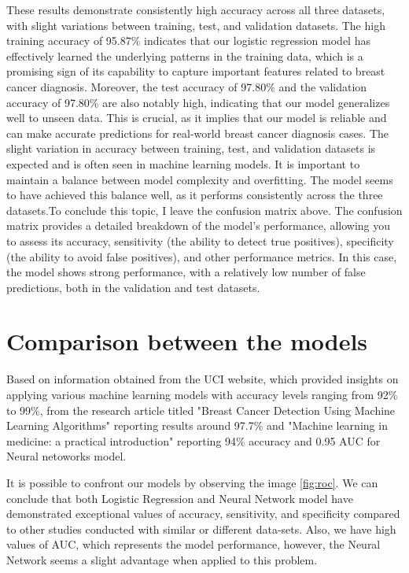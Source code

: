 \documentclass[12pt,a4paper,twocolumn]{article}
\begin{document}
These results demonstrate consistently high accuracy across all three datasets, with slight variations between training, test, and validation datasets. The high training accuracy of 95.87\% indicates that our logistic regression model has effectively learned the underlying patterns in the training data, which is a promising sign of its capability to capture important features related to breast cancer diagnosis. Moreover, the test accuracy of 97.80\% and the validation accuracy of 97.80\% are also notably high, indicating that our model generalizes well to unseen data. This is crucial, as it implies that our model is reliable and can make accurate predictions for real-world breast cancer diagnosis cases. The slight variation in accuracy between training, test, and validation datasets is expected and is often seen in machine learning models. It is important to maintain a balance between model complexity and overfitting. The model seems to have achieved this balance well, as it performs consistently across the three datasets.To conclude this topic, I leave the confusion matrix above. The confusion matrix provides a detailed breakdown of the model's performance, allowing you to assess its accuracy, sensitivity (the ability to detect true positives), specificity (the ability to avoid false positives), and other performance metrics. In this case, the model shows strong performance, with a relatively low number of false predictions, both in the validation and test datasets.



\section{Comparison between the models}
Based on information obtained from the UCI website\cite{misc_breast_cancer}, which provided insights  on applying various machine learning models with accuracy levels ranging from 92\% to 99\%, from the research article titled "Breast Cancer Detection Using Machine Learning Algorithms"\cite{Paper3} reporting results around 97.7\% and \cite{Paper5}"Machine learning in medicine: a practical introduction" reporting 94\% accuracy and 0.95 AUC for Neural netoworks model.
 
\par It is possible to confront our models by observing the image \ref{fig:roc}. We can conclude that both Logistic Regression and Neural Network model have demonstrated exceptional values of  accuracy, sensitivity, and specificity compared to other studies conducted with similar or different data-sets. Also, we have high values of AUC, which represents the model performance, however, the Neural Network seems a slight advantage when applied to this problem.
\end{document}
